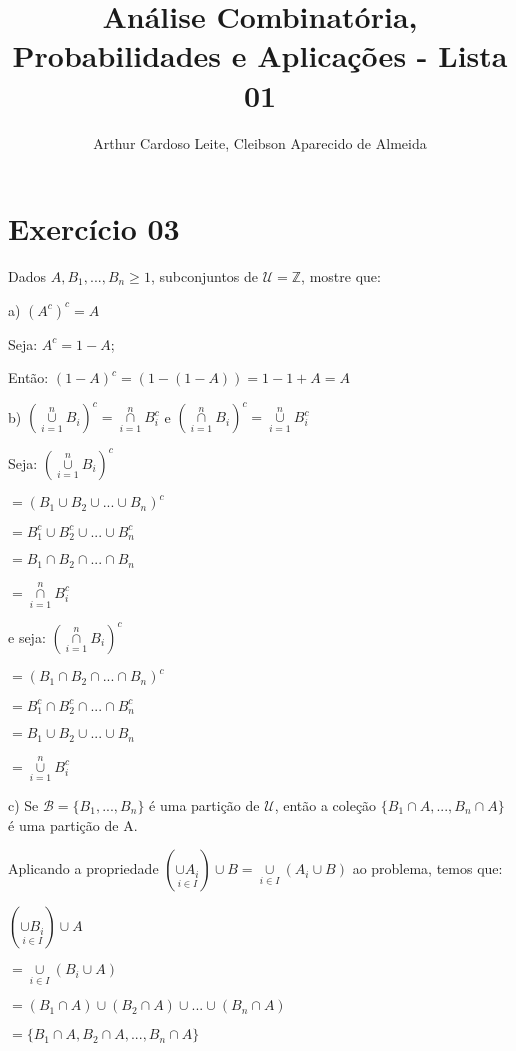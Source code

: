 \documentclass[12pt]{article}
\title{Análise Combinatória, Probabilidades e Aplicações - Lista 01}
\author{{Arthur Cardoso Leite}, {Cleibson Aparecido de Almeida}}
\begin{document}
\maketitle

\section*{Exercício 03}

Dados $A, B_1, ... , B_n \geq 1$, subconjuntos de $\mathcal{U} = \mathbb{Z}$, mostre que:

a) $(A^c)^c = A$

Seja: $A^c = 1-A$;

Então: $(1-A)^c = (1-(1-A)) = 1-1+A = A$

\bigskip

b) $(\overset{n}{\underset{i=1}{\cup}} B_i)^c = \overset{n}{\underset{i=1}{\cap}} B_i^c$ e $(\overset{n}{\underset{i=1}{\cap}} B_i)^c = \overset{n}{\underset{i=1}{\cup}} B_i^c$

Seja: $(\overset{n}{\underset{i=1}{\cup}} B_i)^c$

$= (B_1 \cup B_2 \cup ... \cup B_n)^c$

$= B_1^c \cup B_2^c \cup ... \cup B_n^c$

$= B_1 \cap B_2 \cap ... \cap B_n$

$= \overset{n}{\underset{i=1}{\cap}} B_i^c$

e seja: $(\overset{n}{\underset{i=1}{\cap}} B_i)^c$

$= (B_1 \cap B_2 \cap ... \cap B_n)^c$

$= B_1^c \cap B_2^c \cap ... \cap B_n^c$

$= B_1 \cup B_2 \cup ... \cup B_n$

$= \overset{n}{\underset{i=1}{\cup}} B_i^c$

\bigskip

c) Se $\mathcal{B}=\{B_1,...,B_n\}$ é uma partição de $\mathcal{U}$, então a coleção $\{B_1 \cap A, ..., B_n \cap A\}$ é uma partição de A.

Aplicando a propriedade $(\underset{i \in I}{\cup A_i}) \cup B = \underset{i \in I}{\cup} (A_i \cup B)$ ao problema, temos que:

$(\underset{i \in I}{\cup B_i}) \cup A$

$= \underset{i \in I}{\cup} (B_i \cup A)$

$=(B_1 \cap A) \cup (B_2 \cap A) \cup ... \cup (B_n \cap A)$

$=\{B_1 \cap A, B_2 \cap A, ... , B_n \cap A\}$
\end{document}
